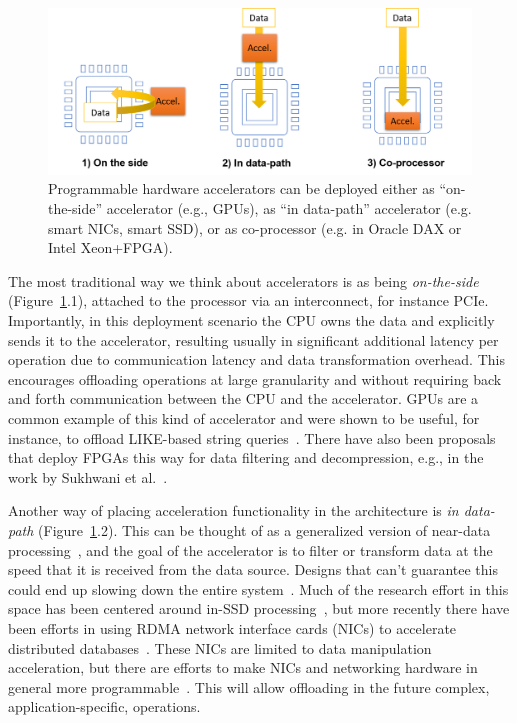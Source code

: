 \documentclass[11pt]{article}
\begin{document}
\begin{figure}[h]
\centering
\includegraphics[width=0.75\linewidth]{figs/accelerator-location.png}
\caption{Programmable hardware accelerators can be deployed either as ``on-the-side'' accelerator (e.g., GPUs), as ``in data-path'' accelerator (e.g. smart NICs, smart SSD), or as co-processor (e.g. in Oracle DAX or Intel Xeon+FPGA). \label{fig:acceleratorlocations}}
\end{figure}

The most traditional way we think about accelerators is as being \emph{on-the-side} (Figure~\ref{fig:acceleratorlocations}.1), attached to the processor via an interconnect, for instance PCIe. Importantly, in this deployment scenario the CPU owns the data and explicitly sends it to the accelerator, resulting usually in significant additional latency per operation due to communication latency and data transformation overhead. This encourages offloading operations at large granularity and without requiring back and forth communication between the CPU and the accelerator. GPUs are a common example of this kind of accelerator and were shown to be useful, for instance, to offload LIKE-based string queries~\cite{sitaridi-gpuregex-2016}. There have also been proposals that deploy FPGAs this way for data filtering and decompression, e.g., in the work by Sukhwani et al.~\cite{sukhwani-dbanalyitcs-ieee14}.

Another way of placing acceleration functionality in the architecture is \emph{in data-path} (Figure~\ref{fig:acceleratorlocations}.2). This can be thought of as a generalized version of near-data processing~\cite{oskin-active-ieee98}, and the goal of the accelerator is to filter or transform data at the speed that it is received from the data source. Designs that can't guarantee this could end up slowing down the entire system~\cite{koo-summarizer-micro17}. Much of the research effort in this space has been centered around in-SSD processing~\cite{jo-yoursql-vldb16}\cite{woods-Ibex-vldb14}, but more recently there have been efforts in using RDMA network interface cards (NICs) to accelerate distributed databases~\cite{barthels-join-sigmod15}\cite{dragojevic-farm-debull17}. These NICs are limited to data manipulation acceleration, but there are efforts to make NICs and networking hardware in general more programmable~\cite{bosshart-p4-comrew14}. This will allow offloading in the future complex, application-specific, operations.
\end{document}
